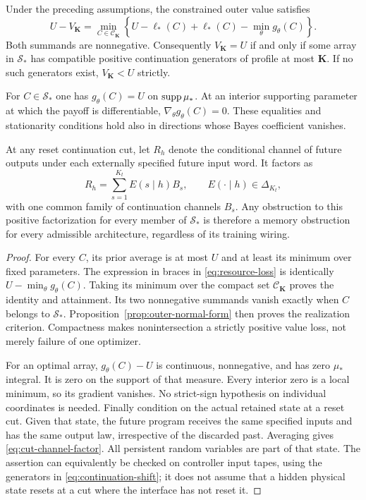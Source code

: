 \begin{theorem}
\label{thm:saddle-realization}
Under the preceding assumptions, the constrained outer value satisfies
\begin{equation}\label{eq:resource-loss}
 U-V_{\mathbf K}=\min_{C\in\mathcal C_{\mathbf K}}
 \left\{U-\ell_*(C)+
                  \ell_*(C)-\min_\theta g_\theta(C)\right\}.
\end{equation}
Both summands are nonnegative. Consequently $V_{\mathbf K}=U$ if and
only if some array in $\mathcal S_*$ has compatible positive
continuation generators of profile at most $\mathbf K$.
If no such generators exist, $V_{\mathbf K}<U$ strictly.

For $C\in\mathcal S_*$ one has $g_\theta(C)=U$ on
$\operatorname{supp}\mu_*$. At an interior supporting parameter at which the payoff
is differentiable, $\nabla_\theta g_\theta(C)=0$. These equalities and
stationarity conditions hold also in directions whose Bayes coefficient
vanishes.

At any reset continuation cut, let $R_h$ denote the conditional channel
of future outputs under each externally specified future input word.
It factors as
\begin{equation}\label{eq:cut-channel-factor}
                  R_h=\sum_{s=1}^{K_t}E(s\mid h)B_s,
 \qquad E(\cdot\mid h)\in\Delta_{K_t},
\end{equation}
with one common family of continuation channels $B_s$.
Any obstruction to this positive factorization for every member of
$\mathcal S_*$ is therefore a memory obstruction for every admissible
architecture, regardless of its training wiring.
\end{theorem}
\begin{proof}
For every $C$, its prior average is at most $U$ and at least its minimum
over fixed parameters. The expression in braces in
\eqref{eq:resource-loss} is identically $U-\min_\theta g_\theta(C)$.
Taking its minimum over the compact set $\mathcal C_{\mathbf K}$ proves
the identity and attainment. Its two nonnegative summands vanish exactly
when $C$ belongs to $\mathcal S_*$. Proposition~\ref{prop:outer-normal-form}
then proves the realization criterion. Compactness makes nonintersection
a strictly positive value loss, not merely failure of one optimizer.

For an optimal array, $g_\theta(C)-U$ is continuous, nonnegative, and
has zero $\mu_*$ integral. It is zero on the support of that measure.
Every interior zero is a local minimum, so its gradient vanishes.
No strict-sign hypothesis on individual coordinates is needed.
Finally condition on the actual retained state at a reset cut. Given
that state, the future program receives the same specified inputs and
has the same output law, irrespective of the discarded past. Averaging
gives \eqref{eq:cut-channel-factor}. All persistent random variables
are part of that state. The assertion can equivalently be checked on
controller input tapes, using the generators in
\eqref{eq:continuation-shift}; it does not assume that a hidden
physical state resets at a cut where the interface has not reset it.
\end{proof}

